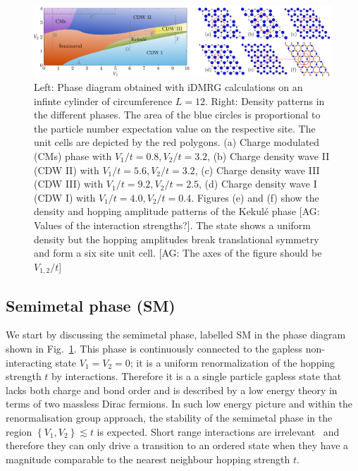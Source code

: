 \documentclass[aps,prx,10pt,twocolumn,floatfix,superscriptaddress,showpacs,numerical,footinbib]{revtex4-1}
\newcommand{\noteAG}[1]{{\color{blue} [AG: #1]}}
\begin{document}
\begin{figure}
 \includegraphics[width=\textwidth]{pdf/phase_diagram_ext.pdf}
 \caption{Left: Phase diagram obtained with iDMRG calculations on an infinte cylinder of circumference $L=12$. 
 Right: Density patterns in the different phases. 
 The area of the blue circles is proportional to the particle number expectation value on the respective site. 
 The unit cells are depicted by the red polygons. 
 (a) Charge modulated (CMs) phase with $V_1/t = 0.8, V_2/t = 3.2 $, (b) Charge density wave II (CDW II) with $V_1/t = 5.6, V_2/t = 3.2$,  (c) Charge density wave III (CDW III) with $V_1/t = 9.2, V_2/t = 2.5$, (d) Charge density wave I (CDW I) with $V_1/t = 4.0, V_2/t = 0.4 $. 
 Figures (e) and (f) show the density and hopping amplitude patterns of the Kekul\'e phase \noteAG{Values of the interaction strengths?}. 
 The state shows a uniform density but the hopping amplitudes break translational symmetry and form a six site unit cell. \label{fig:phase diagram}
 \noteAG{The axes of the figure should be $V_{1,2}/t$}}
\end{figure}




%
\subsection{Semimetal phase (SM)}
%
We start by discussing the semimetal phase, labelled SM in the phase diagram shown in Fig.~\ref{fig:phase diagram}.
%
This phase is continuously connected to the gapless non-interacting state $V_{1}=V_{2}=0$; 
it is a uniform renormalization of the hopping strength $t$ by interactions.
%
Therefore it is a a single particle gapless state that lacks both charge and bond order and is described by a low energy theory in terms of two massless Dirac fermions.
%
In such low energy picture and within the renormalisation group approach, the stability of the semimetal phase in the region $\left\lbrace V_{1},V_{2}\right\rbrace \lesssim t$ is expected.
%
Short range interactions are irrelevant~\cite{S94} and therefore they can only drive a transition to an ordered state when they have a magnitude comparable to the nearest neighbour hopping strength $t$.\\
%
\end{document}
